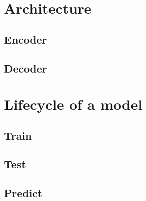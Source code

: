 \section{Architecture}

\subsection{Encoder}

\subsection{Decoder}

\section{Lifecycle of a model}

\subsection{Train}

\subsection{Test}

\subsection{Predict}
